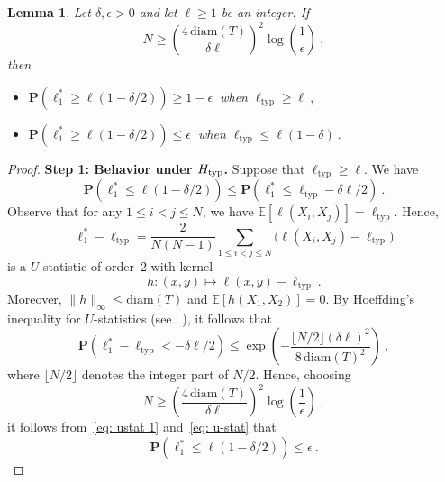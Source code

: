\documentclass[12pt]{article}
\newtheorem{lemma}[theorem]{Lemma}
\newcommand{\prob}[1]{\mathbf{P}\left( #1 \right)}
\newcommand{\diam}[1]{\mathrm{diam}\!\left(#1\right)}
\begin{document}
\begin{lemma}\label{lemma: u-stat}
    Let $\delta,\epsilon>0$ and let $\ell\ge1$ be an integer. If $$N\ge\left(\frac{4\,\diam{T}}{\delta\ell}\right)^2\log\left(\frac{1}{\epsilon}\right)~,$$
    then
    \begin{itemize}
        \item [(i)] $\prob{\ell_1^*\ge \ell(1-\delta/2)}\ge 1-\epsilon~$ when $\ell_{\textrm{typ}}\ge \ell~,$
        \item [(ii)] $\prob{\ell_1^*\ge \ell(1-\delta/2)}\le \epsilon~$ when $\ell_{\textrm{typ}}\le\ell(1-\delta)~.$
    \end{itemize}
\end{lemma}
\begin{proof}
\textbf{Step 1: Behavior under $H_{\rm typ}$.}  Suppose that $\ell_{\mathrm{typ}} \ge \ell$. We have
\begin{equation}\label{eq: ustat 1}
\prob{\ell_1^* \le \ell(1 - \delta/2)} 
\le \prob{\ell_1^* \le \ell_{\mathrm{typ}} - \delta \ell / 2}~.
\end{equation}
Observe that for any $1 \le i < j \le N$, we have $\mathbb{E}[\ell(X_i, X_j)] = \ell_{\mathrm{typ}}$. 
Hence,
\[
\ell_1^* - \ell_{\mathrm{typ}} 
= \frac{2}{N(N - 1)} \sum_{1 \le i < j \le N} \bigl(\ell(X_i, X_j) - \ell_{\mathrm{typ}}\bigr)
\]
is a $U$-statistic of order~2 with kernel 
\[
h:(x, y) \mapsto \ell(x, y) - \ell_{\mathrm{typ}}~.
\]
Moreover, $\|h\|_\infty \le \mathrm{diam}(T)$ and $\mathbb{E}[h(X_1, X_2)] = 0$. 
By Hoeffding's inequality for $U$-statistics (see ~\cite{Ho63}), it follows that
\begin{equation}\label{eq: u-stat}
\prob{\ell_1^* - \ell_{\mathrm{typ}} < - \delta \ell / 2}
\le \exp\!\left(
    -\frac{\lfloor N/2\rfloor (\delta \ell)^2}{8\,\mathrm{diam}(T)^2}
\right)~,
\end{equation}
where $\lfloor N/2\rfloor$ denotes the integer part of $N/2$. 
Hence, choosing
\[
N \ge \left(\frac{4\,\mathrm{diam}(T)}{\delta \ell}\right)^2 
    \log\!\left(\frac{1}{\epsilon}\right)~,
\]
it follows from~\eqref{eq: ustat 1} and~\eqref{eq: u-stat} that
\[
\prob{\ell_1^* \le \ell(1 - \delta/2)} \le \epsilon~.
\]


\end{proof}
\end{document}
